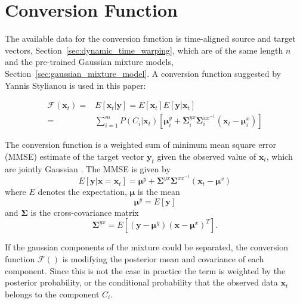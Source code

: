 \section{Conversion Function} %
\label{sec:conversion_function}
The available data for the conversion function is time-aligned source and target vectors, Section~\ref{sec:dynamic_time_warping}, which are of the same length $n$ and the pre-trained Gaussian mixture models, Section~\ref{sec:gaussian_mixture_model}. A conversion function suggested by Yannis Stylianou \etal \cite{stylianou95} is used in this paper:
\begin{defn}
	\label{defn:conversion_function}
	\begin{equation}
		\label{eq:conversion_function}
		\begin{split}
		\mathcal{F}(\mathbf{x}_t) =& E[\mathbf{x}_t\vert \mathbf{y}] = E[\mathbf{x}_t]E[\mathbf{y}\vert \mathbf{x}_t]\\
		 =& \sum_{i=1}^{m}P(C_i \vert \mathbf{x}_t)[\boldsymbol{\mu}_i^y + \mathbf{\Sigma}_i^{yx} \mathbf{\Sigma}_i^{xx^{-1}} (\mathbf{x}_t-\boldsymbol{\mu}_i^x)]
		\end{split}
	\end{equation}	
\end{defn}
The conversion function is a weighted sum of minimum mean square error (MMSE) estimate of the target vector $\mathbf{y}_t$ given the observed value of $\mathbf{x}_t$, which are jointly Gaussian \cite{stylianou98}. The MMSE is given by \cite{taletek}
\begin{equation}
	\label{eq:mmse}
	E[\mathbf{y}\vert \mathbf{x}=\mathbf{x}_t] = \boldsymbol{\mu}^y + \mathbf{\Sigma}^{yx} \mathbf{\Sigma}^{xx^{-1}} (\mathbf{x}_t-\boldsymbol{\mu}^x)
\end{equation}
where $E$ denotes the expectation, $\boldsymbol{\mu}$ is the mean
\begin{equation}
	\boldsymbol{\mu}^y = E[\mathbf{y}]
\end{equation}
and $\mathbf{\Sigma}$ is the cross-covariance matrix
\begin{equation}
	\mathbf{\Sigma}^{yx} = E[(\mathbf{y}-\boldsymbol{\mu}^y)(\mathbf{x}-\boldsymbol{\mu}^x)^T].
\end{equation}

If the gaussian components of the mixture could be separated, the conversion function $\mathcal{F}()$ is modifying the posterior mean and covariance of each component. Since this is not the case in practice the term is weighted by the posterior probability, or the conditional probability that the observed data $\mathbf{x}_t$ belongs to the component $C_i$.

